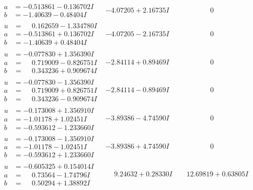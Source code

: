 \documentclass[1p]{elsarticle_modified}
\theoremstyle{definition}
\begin{document}
$$\begin{array}{c|c|c}
\begin{aligned}
a &= -0.513861 - 0.136702 I \\
b &= -1.40639 - 0.48404 I\end{aligned}
 & -4.07205 + 2.16735 I & \phantom{-0.000000 } 0 \\ \hline\begin{aligned}
u &= \phantom{-}0.162659 - 1.334780 I \\
a &= -0.513861 + 0.136702 I \\
b &= -1.40639 + 0.48404 I\end{aligned}
 & -4.07205 - 2.16735 I & \phantom{-0.000000 } 0 \\ \hline\begin{aligned}
u &= -0.077830 + 1.356390 I \\
a &= \phantom{-}0.719009 - 0.826751 I \\
b &= \phantom{-}0.343236 + 0.909674 I\end{aligned}
 & -2.84114 + 0.89469 I & \phantom{-0.000000 } 0 \\ \hline\begin{aligned}
u &= -0.077830 - 1.356390 I \\
a &= \phantom{-}0.719009 + 0.826751 I \\
b &= \phantom{-}0.343236 - 0.909674 I\end{aligned}
 & -2.84114 - 0.89469 I & \phantom{-0.000000 } 0 \\ \hline\begin{aligned}
u &= -0.173008 + 1.356910 I \\
a &= -1.01178 + 1.02451 I \\
b &= -0.593612 - 1.233660 I\end{aligned}
 & -3.89386 - 4.74590 I & \phantom{-0.000000 } 0 \\ \hline\begin{aligned}
u &= -0.173008 - 1.356910 I \\
a &= -1.01178 - 1.02451 I \\
b &= -0.593612 + 1.233660 I\end{aligned}
 & -3.89386 + 4.74590 I & \phantom{-0.000000 } 0 \\ \hline\begin{aligned}
u &= -0.605325 + 0.154014 I \\
a &= \phantom{-}0.73564 - 1.74796 I \\
b &= \phantom{-}0.50294 + 1.38892 I\end{aligned}
 & \phantom{-}9.24632 + 0.28330 I & \phantom{-}12.69819 + 0.63805 I \\ \hline\begin{aligned}

\end{aligned}
\end{array}$$
\end{document}
